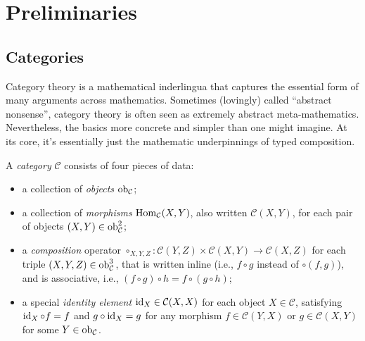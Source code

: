 \section{Preliminaries}

\subsection{Categories}
Category theory is a mathematical inderlingua that captures the essential form of many arguments across mathematics. 
Sometimes (lovingly) called ``abstract nonsense'', category theory is often seen as extremely abstract meta-mathematics.  
Nevertheless, the basics more concrete and simpler than one might imagine.
At its core, it's essentially just the mathematic underpinnings of typed composition.  

\begin{defn}[category]
    A \emph{category} $\mathcal C$ consists of four pieces of data:
    \begin{itemize}[left=0pt,topsep=0pt]
        \item a collection of \emph{objects} $\operatorname{\mathop{\mathrm{ob}}}_{\cal C}$;
        \item a collection of \emph{morphisms}
            $\operatorname{\mathop{\mathrm{Hom}}}_{\mathcal C}(X,Y)$,  also written $\mathcal C(X,Y)$, for each pair of objects $(X,Y) \in \operatorname{\mathop{\mathrm{ob}}}_{\mathcal C}^2$;
        \item a \emph{composition} operator 
        $\circ_{X,Y,Z}: \mathcal C(Y,Z) \times \mathcal C(X,Y) \to \mathcal C(X,Z)$ for each triple $(X,Y,Z) \in \operatorname{\mathop{\mathrm{ob}}}_{\cal C}^3$, that is written inline (i.e., $f \circ g$ instead of $\circ(f,g)$), and is associative, i.e., $(f \circ g) \circ h = f \circ (g \circ h)$;
        \item a special \emph{identity element} $\operatorname{\mathrm{id}}_{X} \in \mathcal C(X,X)$ for each object $X \in \mathcal C$, satisfying $\operatorname{\mathrm{id}}_X \circ f = f$ and $g \circ \operatorname{\mathrm{id}}_X = g$ for any morphism $f \in \mathcal C(Y,X)$ or $g \in \mathcal C(X,Y)$ for some $Y \in \operatorname{\mathop{\mathrm{ob}}}_{\mathcal C}$.
        \qedhere
    \end{itemize}    
\end{defn}

